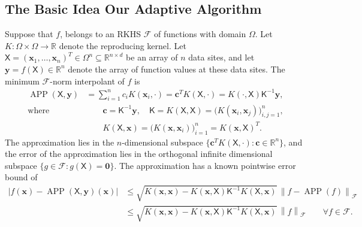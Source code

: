 \documentclass[]{mcom-l}
\theoremstyle{remark}
\DeclareMathOperator{\APP}{APP}
\newcommand{\reals}{{\mathbb{R}}}
\newcommand{\mK}{\mathsf{K}}
\newcommand{\mX}{\mathsf{X}}
\newcommand{\bzero}{\boldsymbol{0}}
\newcommand{\bc}{{\boldsymbol{c}}}
\newcommand{\bx}{{\boldsymbol{x}}}
\newcommand{\by}{{\boldsymbol{y}}}
\newcommand{\cx}{{\Omega}}
\newcommand{\calf}{{\mathcal{F}}}
\def\abs#1{\ensuremath{\left \lvert #1 \right \rvert}}
\newcommand{\norm}[2][{}]{\ensuremath{\left \lVert #2 \right \rVert}_{#1}}
\newcommand{\bignorm}[2][{}]{\ensuremath{\bigl \lVert #2 \bigr \rVert}_{#1}}
\begin{document}
\subsection{The Basic Idea Our Adaptive Algorithm} \label{sec:basicIdea}
Suppose that $f$, belongs to an RKHS $\calf$ of functions with domain $\cx$.  Let $K: \Omega \times \Omega \to \reals$ denote the reproducing kernel.  Let $\mX = (\bx_1, \ldots, \bx_n)^T \in \cx^n \subseteq \reals^{n \times d}$ be an array of $n$ data sites, and let $\by  = f(\mX) \in \reals^n$ denote the array of function values at these data sites.  
The minimum $\calf$-norm interpolant of $f$ is 
\begin{subequations} \label{eq:RKHSAPP}
\begin{align} 
\APP(\mX,\by) &= \sum_{i=1}^n c_i K(\bx_i,\cdot) = \bc^T K(\mX,\cdot) =  K(\cdot, \mX) \mK^{-1} \by, \\
 \text{where } & \qquad \bc = \mK^{-1} \by, \quad \mK = K(\mX,\mX) = \bigl( K(\bx_i,\bx_j) \bigr)_{i,j=1}^n,  \\
& \qquad  K(\mX,\bx) = \bigl(K(\bx,\bx_i) \bigr)_{i=1}^n =  K(\bx, \mX)^T.
\end{align}
\end{subequations}
The approximation lies in the $n$-dimensional subspace $\{\bc^T K(\mX,\cdot) : \bc \in \reals^n \}$, and the error of the approximation lies in the orthogonal infinite dimensional subspace $\{g \in \calf : g(\mX) = \bzero\}$.
The approximation has a known pointwise error bound of \cite{bibid}
\begin{align}
\label{eq:RKHSErrBd}
\abs{f(\bx) - \APP(\mX,\by)(\bx)} & \le \sqrt{K(\bx,\bx) - K(\bx,\mX) \mK^{-1} K(\mX,\bx)} \, \bignorm[\calf]{f - \APP(f)}  \\
\nonumber
& \le \sqrt{K(\bx,\bx) - K(\bx,\mX) \mK^{-1} K(\mX,\bx) } \, \norm[\calf]{f} \qquad \forall f \in \calf.
\end{align}
\end{document}

